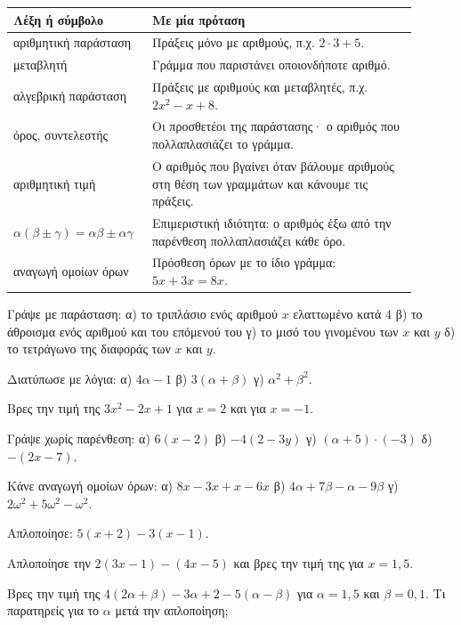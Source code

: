 

\renewcommand{\arraystretch}{1.5}
\begin{longtable}{@{}>{\raggedright\arraybackslash}p{0.28\linewidth} >{\raggedright\arraybackslash}p{0.62\linewidth}@{}}
\toprule
\textbf{Λέξη ή σύμβολο} & \textbf{Με μία πρόταση}\\
\midrule
\endhead
αριθμητική παράσταση & Πράξεις μόνο με αριθμούς, π.χ. $2\cdot3+5$.\\
μεταβλητή & Γράμμα που παριστάνει οποιονδήποτε αριθμό.\\
αλγεβρική παράσταση & Πράξεις με αριθμούς και μεταβλητές, π.χ. $2x^2-x+8$.\\
όρος, συντελεστής & Οι προσθετέοι της παράστασης· ο αριθμός που πολλαπλασιάζει το γράμμα.\\
αριθμητική τιμή & Ο αριθμός που βγαίνει όταν βάλουμε αριθμούς στη θέση των γραμμάτων και κάνουμε τις πράξεις.\\
$\alpha(\beta\pm\gamma)=\alpha\beta\pm\alpha\gamma$ & Επιμεριστική ιδιότητα: ο αριθμός έξω από την παρένθεση πολλαπλασιάζει κάθε όρο.\\
αναγωγή ομοίων όρων & Πρόσθεση όρων με το ίδιο γράμμα: $5x+3x=8x$.\\
\bottomrule
\end{longtable}


\ex Γράψε με παράσταση: α) το τριπλάσιο ενός αριθμού $x$ ελαττωμένο κατά $4$ \quad β) το άθροισμα ενός αριθμού και του επόμενού του \quad γ) το μισό του γινομένου των $x$ και $y$ \quad δ) το τετράγωνο της διαφοράς των $x$ και $y$.

\ex Διατύπωσε με λόγια: α) $4\alpha-1$ \quad β) $3(\alpha+\beta)$ \quad γ) $\alpha^2+\beta^2$.

\ex Βρες την τιμή της $3x^2-2x+1$ για $x=2$ και για $x=-1$.

\ex Γράψε χωρίς παρένθεση: α) $6(x-2)$ \quad β) $-4(2-3y)$ \quad γ) $(\alpha+5)\cdot(-3)$ \quad δ) $-(2x-7)$.

\ex Κάνε αναγωγή ομοίων όρων: α) $8x-3x+x-6x$ \quad β) $4\alpha+7\beta-\alpha-9\beta$ \quad γ) $2\omega^2+5\omega^2-\omega^2$.

\ex Απλοποίησε: $5(x+2)-3(x-1)$.

\ex Απλοποίησε την $2(3x-1)-(4x-5)$ και βρες την τιμή της για $x=1{,}5$.

\ex Βρες την τιμή της $4(2\alpha+\beta)-3\alpha+2-5(\alpha-\beta)$ για $\alpha=1{,}5$ και $\beta=0{,}1$. Τι παρατηρείς για το $\alpha$ μετά την απλοποίηση;

